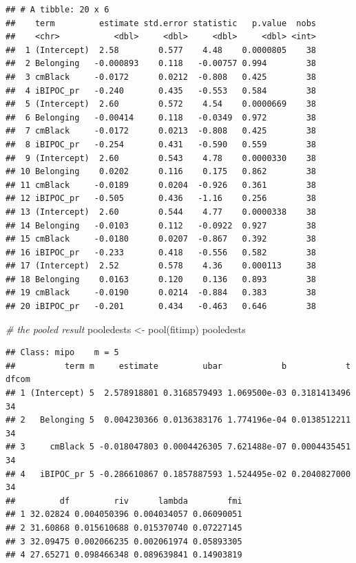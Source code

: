 \documentclass[
  english,
]{book}
\newenvironment{Shaded}{\begin{snugshade}}{\end{snugshade}}
\newcommand{\CommentTok}[1]{\textcolor[rgb]{0.56,0.35,0.01}{\textit{#1}}}
\newcommand{\FunctionTok}[1]{\textcolor[rgb]{0.00,0.00,0.00}{#1}}
\newcommand{\NormalTok}[1]{#1}
\newcommand{\OtherTok}[1]{\textcolor[rgb]{0.56,0.35,0.01}{#1}}
\begin{document}
\begin{verbatim}
## # A tibble: 20 x 6
##    term         estimate std.error statistic   p.value  nobs
##    <chr>           <dbl>     <dbl>     <dbl>     <dbl> <int>
##  1 (Intercept)  2.58        0.577    4.48    0.0000805    38
##  2 Belonging   -0.000893    0.118   -0.00757 0.994        38
##  3 cmBlack     -0.0172      0.0212  -0.808   0.425        38
##  4 iBIPOC_pr   -0.240       0.435   -0.553   0.584        38
##  5 (Intercept)  2.60        0.572    4.54    0.0000669    38
##  6 Belonging   -0.00414     0.118   -0.0349  0.972        38
##  7 cmBlack     -0.0172      0.0213  -0.808   0.425        38
##  8 iBIPOC_pr   -0.254       0.431   -0.590   0.559        38
##  9 (Intercept)  2.60        0.543    4.78    0.0000330    38
## 10 Belonging    0.0202      0.116    0.175   0.862        38
## 11 cmBlack     -0.0189      0.0204  -0.926   0.361        38
## 12 iBIPOC_pr   -0.505       0.436   -1.16    0.256        38
## 13 (Intercept)  2.60        0.544    4.77    0.0000338    38
## 14 Belonging   -0.0103      0.112   -0.0922  0.927        38
## 15 cmBlack     -0.0180      0.0207  -0.867   0.392        38
## 16 iBIPOC_pr   -0.233       0.418   -0.556   0.582        38
## 17 (Intercept)  2.52        0.578    4.36    0.000113     38
## 18 Belonging    0.0163      0.120    0.136   0.893        38
## 19 cmBlack     -0.0190      0.0214  -0.884   0.383        38
## 20 iBIPOC_pr   -0.201       0.434   -0.463   0.646        38
\end{verbatim}

\begin{Shaded}
\begin{Highlighting}[]
\CommentTok{\# the pooled result}
\NormalTok{pooledests }\OtherTok{\textless{}{-}} \FunctionTok{pool}\NormalTok{(fitimp)}
\NormalTok{pooledests}
\end{Highlighting}
\end{Shaded}

\begin{verbatim}
## Class: mipo    m = 5 
##          term m     estimate         ubar            b            t dfcom
## 1 (Intercept) 5  2.578918801 0.3168579493 1.069500e-03 0.3181413496    34
## 2   Belonging 5  0.004230366 0.0136383176 1.774196e-04 0.0138512211    34
## 3     cmBlack 5 -0.018047803 0.0004426305 7.621488e-07 0.0004435451    34
## 4   iBIPOC_pr 5 -0.286610867 0.1857887593 1.524495e-02 0.2040827000    34
##         df         riv      lambda        fmi
## 1 32.02824 0.004050396 0.004034057 0.06090051
## 2 31.60868 0.015610688 0.015370740 0.07227145
## 3 32.09475 0.002066235 0.002061974 0.05893305
## 4 27.65271 0.098466348 0.089639841 0.14903819
\end{verbatim}
\end{document}
